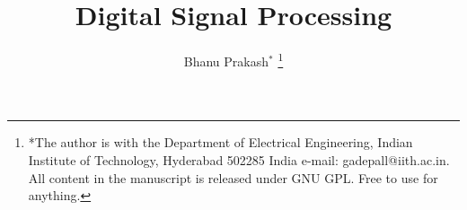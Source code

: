 \documentclass[journal,12pt,twocolumn]{IEEEtran}
\begin{document}

\def\putbox#1#2#3{\makebox[0in][l]{\makebox[#1][l]{}\raisebox{\baselineskip}[0in][0in]{\raisebox{#2}[0in][0in]{#3}}}}
     \def\rightbox#1{\makebox[0in][r]{#1}}
     \def\centbox#1{\makebox[0in]{#1}}
     \def\topbox#1{\raisebox{-\baselineskip}[0in][0in]{#1}}
     \def\midbox#1{\raisebox{-0.5\baselineskip}[0in][0in]{#1}}

\vspace{3cm}

\title{ 
Digital Signal Processing
}


%
%
%

\author{ Bhanu Prakash$^{*}$ %
\thanks{*The author is with the Department
of Electrical Engineering, Indian Institute of Technology, Hyderabad
502285 India e-mail:  gadepall@iith.ac.in.  All content in the manuscript is 
released under GNU GPL.  Free to use for anything. }%
}
% 
%
\end{document}
